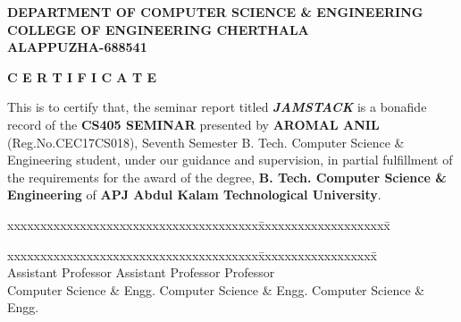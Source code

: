 \documentclass[12pt,a4paper,oneside]{report}
\begin{document}
\begin{titlepage}
\begin{center}

\large{\textbf{DEPARTMENT OF COMPUTER SCIENCE \& ENGINEERING}}\\
\large{\textbf{COLLEGE OF ENGINEERING CHERTHALA\\ALAPPUZHA-688541}}\\
\end{center}
\begin{figure}[h]
\begin{center}
\end{center}
\end{figure}
\begin{center}
\large{\textbf{C E R T I F I C A T E}}\\
\end{center}
\begin{spacing}{1.5}
This is to certify that, the seminar report titled  \textbf{\textit{ JAMSTACK}} is a bonafide record of the \textbf{CS405 SEMINAR} presented by \textbf{AROMAL ANIL} (Reg.No.CEC17CS018), Seventh Semester B. Tech. Computer Science \& Engineering  student,  under our guidance and supervision, in partial fulfillment of the requirements for the award of the degree, \textbf{B. Tech. Computer Science  \& Engineering } of \textbf{APJ Abdul Kalam Technological University}.
\end{spacing}
\begin{tabbing}
xxxxxxxxxxxxxxxxxxxxxxxxxxxxxxxxxxxxxx\= xxxxxxxxxxxxxxxxxxxx\= \kill
\hspace{.15in}{\bf Guide} \>\hspace{-.7in}{\bf Co-ordinator}\hspace{1.32in}{\bf  HoD  } \\
\end{tabbing}
\begin{tabbing}
xxxxxxxxxxxxxxxxxxxxxxxxxxxxxxxxxxxxxx\= xxxxxxxxxxxxxxxxxx\= \kill
   \>\hspace{-.7in}{\bf Mrs. Janu R Panicker} \hspace{.65 in}{\bf Dr. Priya S}\\
\hspace{.15in}Assistant Professor    \>\hspace{-.7in}Assistant Professor\>\hspace{.06in} Professor\\
\hspace{.1in} Computer Science \& Engg.    \>\hspace{-.75in}    Computer Science \& Engg. \>\hspace{.03in}    Computer Science \& Engg.\\

\end{tabbing}
\end{titlepage}
\end{document}
